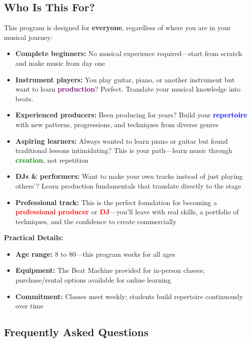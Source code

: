 \documentclass[11pt,letterpaper]{article}
\newcommand{\purple}[1]{\textcolor{purple}{\textbf{#1}}}
\newcommand{\bluepurple}[1]{\textcolor{blue}{\textbf{#1}}}
\newcommand{\greentext}[1]{\textcolor{green}{\textbf{#1}}}
\newcommand{\redtext}[1]{\textcolor{red}{\textbf{#1}}}
\begin{document}
\vspace{0.5cm}

\subsection*{Who Is This For?}

This program is designed for \textbf{everyone}, regardless of where you are in your musical journey:

\begin{itemize}[leftmargin=*]
\item \textbf{Complete beginners:} No musical experience required—start from scratch and make music from day one
\item \textbf{Instrument players:} You play guitar, piano, or another instrument but want to learn \purple{production}? Perfect. Translate your musical knowledge into beats.
\item \textbf{Experienced producers:} Been producing for years? Build your \bluepurple{repertoire} with new patterns, progressions, and techniques from diverse genres
\item \textbf{Aspiring learners:} Always wanted to learn piano or guitar but found traditional lessons intimidating? This is your path—learn music through \greentext{creation}, not repetition
\item \textbf{DJs \& performers:} Want to make your own tracks instead of just playing others'? Learn production fundamentals that translate directly to the stage
\item \textbf{Professional track:} This is the perfect foundation for becoming a \redtext{professional producer} or \redtext{DJ}—you'll leave with real skills, a portfolio of techniques, and the confidence to create commercially
\end{itemize}

\textbf{Practical Details:}
\begin{itemize}[leftmargin=*]
\item \textbf{Age range:} 8 to 80—this program works for all ages
\item \textbf{Equipment:} The Beat Machine provided for in-person classes; purchase/rental options available for online learning
\item \textbf{Commitment:} Classes meet weekly; students build repertoire continuously over time
\end{itemize}

\subsection*{Frequently Asked Questions}
\end{document}

